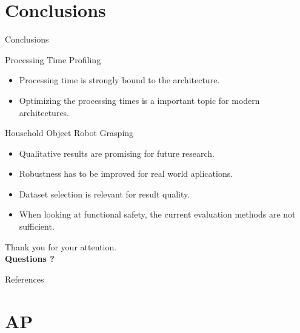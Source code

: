 \documentclass[18pt]{beamer}
\begin{document}
\section{Conclusions}
\begin{frame}{Conclusions}

\begin{block}{Processing Time Profiling}
	\begin{itemize}
		\item Processing time is strongly bound to the architecture.
		\item Optimizing the processing times is a important topic for modern architectures.
	\end{itemize}
\end{block}
\pause
\begin{block}{Household Object Robot Grasping}
    \begin{itemize}
        \item Qualitative results are promising for future research.
        \item Robustness has to be improved for real world aplications.
        \item Dataset selection is relevant for result quality.
        \item When looking at functional safety, the current evaluation methods are not sufficient.
    \end{itemize}
\end{block}
\end{frame}

\begin{frame}
\vfill
\centering
{\LARGE Thank you for your attention.}\\
\vspace{1cm}
{\Large \textbf{Questions ?}}
\vfill
\end{frame}

\appendix
\beginbackup

\nocite{*}

\begin{frame}[allowframebreaks]{References}
\printbibliography
\end{frame}

\section{AP}
\end{document}
